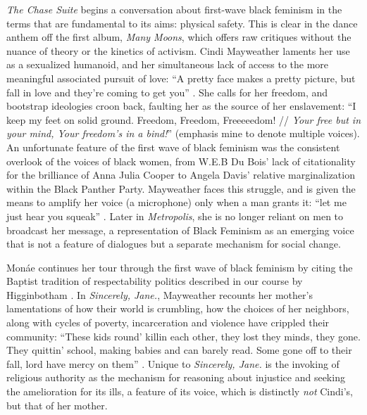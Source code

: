 \documentclass[a4paper, 11pt]{article} %
\begin{document}
\emph{The Chase Suite} begins a conversation about first-wave black feminism in the terms that are fundamental to its aims: physical safety.
This is clear in the dance anthem off the first album, \emph{Many Moons}, which offers raw critiques without the nuance of theory or the kinetics of activism.
Cindi Mayweather laments her use as a sexualized humanoid, and her simultaneous lack of access to the more meaningful associated pursuit of love: ``A pretty face makes a pretty picture, but fall in love and they're coming to get you'' \cite{happyhunting}.
She calls for her freedom, and bootstrap ideologies croon back, faulting her as the source of her enslavement: ``I keep my feet on solid ground. Freedom, Freedom, Freeeeedom! // \emph{Your free but in your mind, Your freedom's in a bind!}'' \cite{manymoons} (emphasis mine to denote multiple voices).
An unfortunate feature of the first wave of black feminism was the consistent overlook of the voices of black women, from W.E.B Du Bois' lack of citationality for the brilliance of Anna Julia Cooper to Angela Davis' relative marginalization within the Black Panther Party.
Mayweather faces this struggle, and is given the means to amplify her voice (a microphone) only when a man grants it: ``let me just hear you squeak'' \cite{manymoons}.
Later in \emph{Metropolis}, she is no longer reliant on men to broadcast her message, a representation of Black Feminism as an emerging voice that is not a feature of dialogues but a separate mechanism for social change. 

Mon\'ae continues her tour through the first wave of black feminism by citing the Baptist tradition of respectability politics described in our course by Higginbotham \cite{higginbotham}.
In \emph{Sincerely, Jane.}, Mayweather recounts her mother's lamentations of how their world is crumbling, how the choices of her neighbors, along with cycles of poverty, incarceration and violence have crippled their community:
``These kids round' killin each other, they lost they minds, they gone. They quittin' school, making babies and can barely read. Some gone off to their fall, lord have mercy on them'' \cite{sincerelyjane}. 
Unique to \emph{Sincerely, Jane.} is the invoking of religious authority as the mechanism for reasoning about injustice and seeking the amelioration for its ills, a feature of its voice, which is distinctly \emph{not} Cindi's, but that of her mother.
\end{document}
